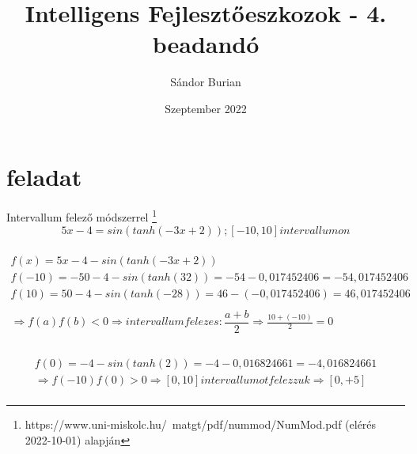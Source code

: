 \documentclass{article}
\title{Intelligens Fejlesztőeszkozok - 4. beadandó}
\author{Sándor Burian}
\date{Szeptember 2022}
\begin{document}
\maketitle

\section{feladat}

Intervallum felező módszerrel \footnote{https://www.uni-miskolc.hu/~matgt/pdf/nummod/NumMod.pdf (elérés 2022-10-01) alapján}
\begin{equation}
    5x-4 = sin(tanh(-3x+2)); [-10,10] intervallumon 
\end{equation}

\begin{multline}
\\
f(x) = 5x-4-sin(tanh(-3x+2)) \\
f(-10)=-50-4-sin(tanh(32)) = -54 - 0,017452406 = -54,017452406 \\
f(10) = 50-4 - sin(tanh(-28)) = 46 - (-0,017452406) = 46,017452406 \\
\\
\Rightarrow f(a)f(b)<0 \Rightarrow intervallumfelezes: \dfrac{a+b}{2} \Rightarrow \frac{10+(-10)}{2} = 0 \\
\end{multline}

\begin{multline}
\\
f(0) = -4-sin(tanh(2)) = -4-0,016824661 = -4,016824661\\
\Rightarrow f(-10)f(0) > 0 \Rightarrow [0,10] intervallumot felezzuk \Rightarrow [0,+5] \\
\end{multline}
\end{document}
